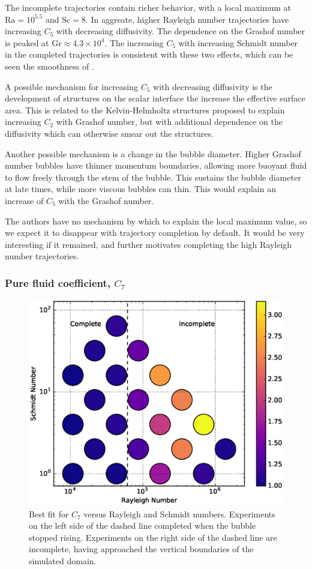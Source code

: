 The incomplete trajectories contain richer behavior, with a local maximum at $\text{Ra} = 10^{5.5}$ and $\text{Sc} = 8$.
In aggreate, higher Rayleigh number trajectories have increasing $C_5$ with decreasing diffusivity.
The dependence on the Grashof number is peaked at $\text{Gr} \approx 4.3 \times 10^4$.
The increasing $C_5$ with increasing Schmidt number in the completed trajectories is consistent with these two effects, which can be seen the smoothness of .

A possible mechanism for increasing $C_5$ with decreasing diffusivity is the development of structures on the scalar interface the increase the effective surface area.
This is related to the Kelvin-Helmholtz structures proposed to explain increasing $C_2$ with Grashof number, but with additional dependence on the diffusivity which can otherwise smear out the structures.

Another possible mechanism is a change in the bubble diameter.
Higher Grashof number bubbles have thinner momentum boundaries, allowing more buoyant fluid to flow freely through the stem of the bubble.
This sustains the bubble diameter at late times, while more viscous bubbles can thin.
This would explain an increase of $C_5$ with the Grashof number.

The authors have no mechanism by which to explain the local maximum value, so we expect it to disappear with trajectory completion by default.
It would be very interesting if it remained, and further motivates completing the high Rayleigh number trajectories.

\subsubsection{Pure fluid coefficient, $C_7$}
\begin{figure}
\includegraphics[width=\columnwidth]{figs/C7-vs-Rayleigh-Schmidt}
\caption{ 
  Best fit for $C_7$ versus Rayleigh and Schmidt numbers.
  Experiments on the left side of the dashed line completed when the bubble stopped rising.
  Experiments on the right side of the dashed line are incomplete, having approached the vertical boundaries of the simulated domain.
}
\end{figure}

